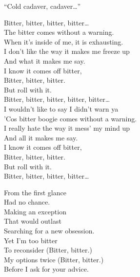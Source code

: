 ``Cold cadaver, cadaver…'' \\





Bitter, bitter, bitter, bitter… \\

The bitter  comes without a warning. \\
When it's inside of me, it is exhausting. \\
I don't like the way it makes me freeze up \\
And what it makes me say. \\

I know it comes off bitter, \\
Bitter, bitter, bitter. \\
But roll with it. \\

Bitter, bitter, bitter, bitter, bitter… \\

I wouldn't like to say I didn't warn ya \\
'Cos bitter boogie comes without a warning. \\
I really hate the way it mess' my mind up \\
And all it makes me say. \\

I know it comes off bitter, \\
Bitter, bitter, bitter. \\
But roll with it. \\

Bitter, bitter, bitter, bitter… \\


From the first glance \\
Had no chance. \\
Making an exception \\
That would outlast \\
Searching for a new obsession. \\

Yet I'm too bitter \\
To reconsider (Bitter, bitter.) \\
My options twice (Bitter, bitter.) \\
Before I ask for your advice. \\

